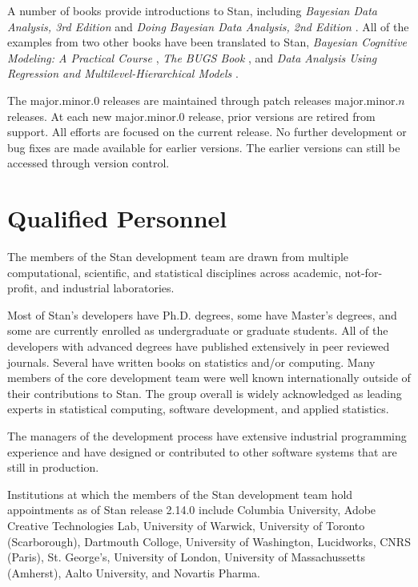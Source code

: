 A number of books provide introductions to Stan, including {\it
  Bayesian Data Analysis, 3rd Edition} \citep{GelmanEtAl:2013} and
{\it Doing Bayesian Data Analysis, 2nd Edition} \citep{Kruschke:2014}.
All of the examples from two other books have been translated to
Stan, {\it Bayesian Cognitive Modeling: A Practical Course}
\citep{LeeWagenmakers:2013}, {\it The BUGS Book}
\citep{LunnEtAl:2012}, and {\it Data Analysis Using Regression and
  Multilevel-Hierarchical Models} \citep{GelmanHill:2007}.

The major.minor.0 releases are maintained through patch releases
major.minor.$n$ releases.  At each new major.minor.0 release, prior
versions are retired from support.  All efforts are focused on the
current release.  No further development or bug fixes are made
available for earlier versions.  The earlier versions can still be
accessed through version control.


\section{Qualified Personnel}

The members of the Stan development team are drawn from multiple
computational, scientific, and statistical disciplines across
academic, not-for-profit, and industrial laboratories. 

Most of Stan's developers have Ph.D. degrees, some have Master's
degrees, and some are currently enrolled as undergraduate or graduate
students. All of the developers with advanced degrees have published
extensively in peer reviewed journals. Several have written books on
statistics and/or computing. Many members of the core development team
were well known internationally outside of their contributions to Stan.
The group overall is widely acknowledged as leading experts in
statistical computing, software development, and applied statistics.

The managers of the development process have extensive industrial
programming experience and have designed or contributed to other
software systems that are still in production.

Institutions at which the members of the Stan development team hold
appointments as of Stan release 2.14.0 include Columbia University,
Adobe Creative Technologies Lab, University of Warwick, University of
Toronto (Scarborough), Dartmouth Colloge, University of Washington,
Lucidworks, CNRS (Paris), St. George's, University of London,
University of Massachussetts (Amherst), Aalto University, and Novartis
Pharma.

